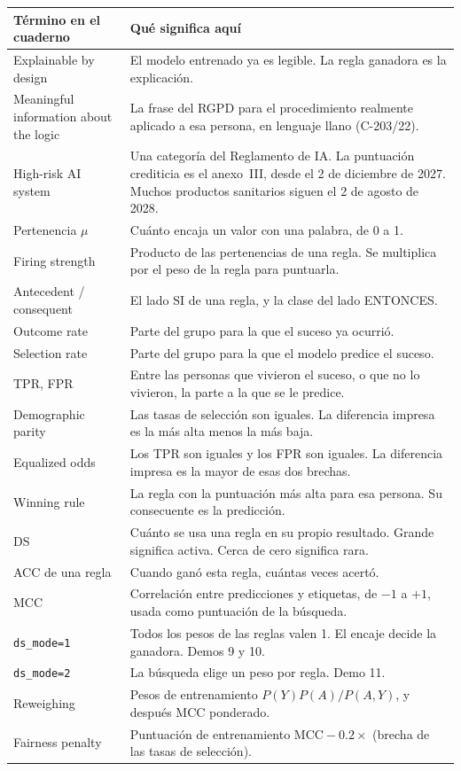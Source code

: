 \documentclass[11pt]{article}
\newcommand{\fn}[1]{\texttt{\small #1}}
\begin{document}
\begin{table}[H]
\centering
\small
\begin{tabularx}{\textwidth}{@{}l Y@{}}
\toprule
Término en el cuaderno & Qué significa aquí \\
\midrule
Explainable by design & El modelo entrenado ya es legible. La regla ganadora es la explicación. \\
Meaningful information about the logic & La frase del RGPD para el procedimiento realmente aplicado a esa persona, en lenguaje llano (C-203/22). \\
High-risk AI system & Una categoría del Reglamento de IA. La puntuación crediticia es el anexo~III, desde el 2 de diciembre de 2027. Muchos productos sanitarios siguen el 2 de agosto de 2028. \\
Pertenencia \(\mu\) & Cuánto encaja un valor con una palabra, de 0 a 1. \\
Firing strength & Producto de las pertenencias de una regla. Se multiplica por el peso de la regla para puntuarla. \\
Antecedent / consequent & El lado SI de una regla, y la clase del lado ENTONCES. \\
Outcome rate & Parte del grupo para la que el suceso ya ocurrió. \\
Selection rate & Parte del grupo para la que el modelo predice el suceso. \\
TPR, FPR & Entre las personas que vivieron el suceso, o que no lo vivieron, la parte a la que se le predice. \\
Demographic parity & Las tasas de selección son iguales. La diferencia impresa es la más alta menos la más baja. \\
Equalized odds & Los TPR son iguales y los FPR son iguales. La diferencia impresa es la mayor de esas dos brechas. \\
Winning rule & La regla con la puntuación más alta para esa persona. Su consecuente es la predicción. \\
DS & Cuánto se usa una regla en su propio resultado. Grande significa activa. Cerca de cero significa rara. \\
ACC de una regla & Cuando ganó esta regla, cuántas veces acertó. \\
MCC & Correlación entre predicciones y etiquetas, de \(-1\) a \(+1\), usada como puntuación de la búsqueda. \\
\fn{ds\_mode=1} & Todos los pesos de las reglas valen 1. El encaje decide la ganadora. Demos 9 y 10. \\
\fn{ds\_mode=2} & La búsqueda elige un peso por regla. Demo 11. \\
Reweighing & Pesos de entrenamiento \(P(Y)P(A)/P(A,Y)\), y después MCC ponderado. \\
Fairness penalty & Puntuación de entrenamiento \(\mathrm{MCC} - 0.2 \times\) (brecha de las tasas de selección). \\
\bottomrule
\end{tabularx}
\end{table}
\end{document}
